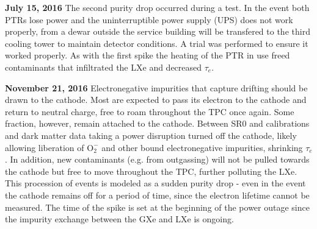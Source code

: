 \textbf{July 15, 2016}  The second purity drop occurred during a \lntwo test.  In the event both PTRs lose power and the uninterruptible
power supply
(UPS) does not work properly, \lntwo from a dewar outside the service building will be transfered to the third cooling tower to maintain
detector conditions.  A trial was performed to ensure it worked properly.  As with the first spike the heating of the PTR in use freed
contaminants that infiltrated the LXe and decreased $\tau_e$.

\begin{table}
\centering
{}
\caption{Purity drops over the lifetime of XENON1T.  Dates and expected causes are given, along with detector region (GXe or LXe) impurity
release is thought to occur.  Cathode voltage and PTR power outages are given as they are believed to contribute to LXe and GXe
contaminations, respectively.}
\label{tab:electron_lifetime_model_detector_effects_spikes_dates}
\end{table}

\textbf{November 21, 2016}  Electronegative impurities that capture drifting \electron should be drawn to the cathode.  Most are
expected to pass its electron to the cathode and return to neutral charge, free to roam throughout the TPC once again.  Some fraction,
however, remain attached to the cathode.  Between SR0 \ambe and \metakr calibrations and dark matter data taking a power disruption
turned off the cathode, likely allowing liberation of $\mathrm{O_2^-}$ and other bound electronegative impurities, shrinking
$\tau_e$.  In addition, new contaminants (e.g. from outgassing) will not be pulled towards the cathode but free to move throughout the TPC,
further polluting the LXe.  This procession of events is modeled as a sudden purity drop - even in the event the cathode remains off for a
period of time, since the electron lifetime cannot be measured.  The time of the spike is set at the beginning of the power outage since
the impurity exchange between the GXe and LXe is ongoing.

